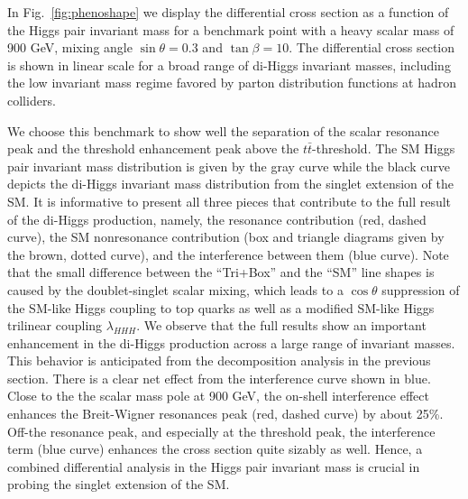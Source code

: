 In Fig.~\ref{fig:phenoshape} we display the differential cross section as a function of the Higgs pair invariant mass for a benchmark point with a heavy scalar mass of 900 GeV, mixing angle $\sin\theta=0.3$ and $\tan\beta=10$. 
The differential cross section is shown in linear scale for a broad range of di-Higgs invariant masses,  including the low invariant mass regime favored by parton distribution functions at hadron colliders.

We choose this benchmark to show well the separation of the scalar resonance peak and the threshold enhancement peak above the $t\bar t$-threshold. The SM Higgs pair invariant mass distribution is given by the  gray curve while the black curve depicts the di-Higgs invariant mass distribution from the singlet extension of the SM. 
It is informative to present all three pieces that contribute to the full result of the di-Higgs production, namely, the resonance contribution (red, dashed curve), the SM nonresonance contribution (box and triangle diagrams given by the brown, dotted curve), and the interference between them (blue curve). 
Note that the small difference between the ``Tri+Box'' and the ``SM'' line shapes is caused by the doublet-singlet scalar mixing, which leads to a $\cos\theta$ suppression of the SM-like Higgs coupling to top quarks as well as a modified SM-like Higgs trilinear coupling $\lambda_{HHH}$.
We observe that the full results show an important enhancement in the di-Higgs production across a  large range of invariant masses. This behavior is anticipated from the decomposition analysis in the previous section. There is a clear net effect from  the interference curve shown in blue.  Close to the the scalar mass pole at 900 GeV, the on-shell interference effect enhances the Breit-Wigner resonances peak (red, dashed curve) by about 25\%. Off-the resonance peak, and especially at the threshold peak, the interference term (blue curve) enhances the cross section quite sizably as well. Hence, a combined differential analysis in the Higgs pair invariant mass is crucial in probing the singlet extension of the SM. 


